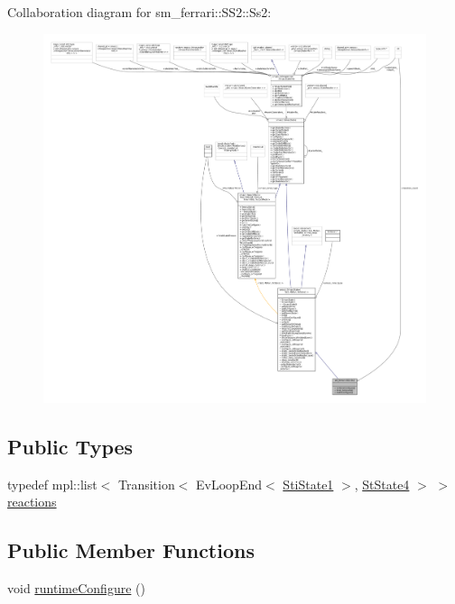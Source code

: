 Collaboration diagram for sm\+\_\+ferrari\+:\+:S\+S2\+:\+:Ss2\+:
\nopagebreak
\begin{figure}[H]
\begin{center}
\leavevmode
\includegraphics[width=350pt]{structsm__ferrari_1_1SS2_1_1Ss2__coll__graph}
\end{center}
\end{figure}
\subsection*{Public Types}
\begin{DoxyCompactItemize}
\item 
typedef mpl\+::list$<$ Transition$<$ Ev\+Loop\+End$<$ \hyperlink{structsm__ferrari_1_1inner__states_1_1StiState1}{Sti\+State1} $>$, \hyperlink{structsm__ferrari_1_1StState4}{St\+State4} $>$ $>$ \hyperlink{structsm__ferrari_1_1SS2_1_1Ss2_a8a6bc434259cb67fe2aa8fe7c510f260}{reactions}
\end{DoxyCompactItemize}
\subsection*{Public Member Functions}
\begin{DoxyCompactItemize}
\item 
void \hyperlink{structsm__ferrari_1_1SS2_1_1Ss2_aa6835e139acefb311a3a8bda8efcf350}{runtime\+Configure} ()
\end{DoxyCompactItemize}
